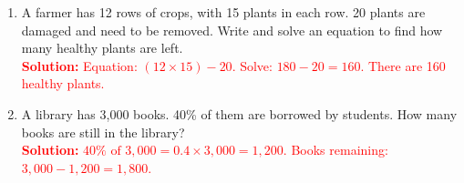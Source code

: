 \documentclass[12pt]{article}
\begin{document}
\begin{tcolorbox}[colframe=black!60, colback=white, 
coltitle=black, colbacktitle=black!15, fonttitle=\bfseries\Large, 
title=Problems, halign title=center, left=10pt, right=10pt, top=10pt, bottom=80pt]
\begin{enumerate}[start=9, itemsep=2em]
    \item A farmer has 12 rows of crops, with 15 plants in each row. 20 plants are damaged and need to be removed. Write and solve an equation to find how many healthy plants are left.\\
    \textcolor{red}{\textbf{Solution:} Equation: \( (12 \times 15) - 20 \). Solve: \( 180 - 20 = 160 \). There are 160 healthy plants.}

    \item A library has 3,000 books. 40\% of them are borrowed by students. How many books are still in the library?\\
    \textcolor{red}{\textbf{Solution:} \( 40\% \text{ of } 3,000 = 0.4 \times 3,000 = 1,200 \). Books remaining: \( 3,000 - 1,200 = 1,800 \).}
\end{enumerate}
\end{tcolorbox}

\vspace{1em}
\end{document}
